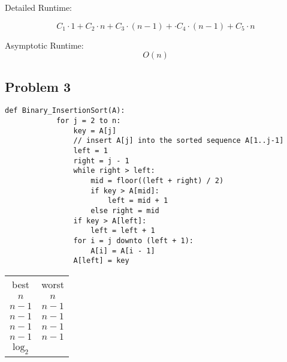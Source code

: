 \documentclass{article}
\begin{document}
Detailed Runtime:

\begin{equation*}
    C_1 \cdot 1 + C_2 \cdot n + C_3 \cdot (n - 1) + \cdot C_4 \cdot (n - 1) + C_5 \cdot n
\end{equation*}

Asymptotic Runtime:
\begin{equation*}
    O(n)
\end{equation*}

\pagebreak

\subsection*{Problem 3}
\begin{multicols}{2}
    \begin{lstlisting}[firstnumber=0]
        def Binary_InsertionSort(A):
            for j = 2 to n:
                key = A[j]
                // insert A[j] into the sorted sequence A[1..j-1]
                left = 1
                right = j - 1
                while right > left:
                    mid = floor((left + right) / 2)
                    if key > A[mid]:
                        left = mid + 1
                    else right = mid
                if key > A[left]:
                    left = left + 1
                for i = j downto (left + 1):
                    A[i] = A[i - 1]
                A[left] = key
    \end{lstlisting}
    \columnbreak
    \footnotesize
    \begin{tabular}{cc}
        best  & worst \\
        $n$   & $n$   \\
        $n-1$ & $n-1$ \\
        $n-1$ & $n-1$ \\[1em]
        $n-1$ & $n-1$ \\
        $n-1$ & $n-1$ \\
        $\log_2$
    \end{tabular}
\end{multicols}
\end{document}
